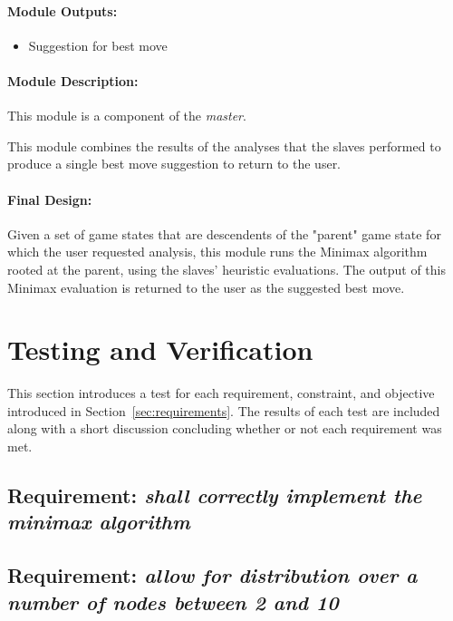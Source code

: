 \documentclass[pdftex,12pt,a4paper]{article}
\begin{document}
\paragraph{Module Outputs:}
\begin{itemize}
\item Suggestion for best move
\end{itemize}

\paragraph{Module Description:\\}
This module is a component of the \emph{master}.

This module combines the results of the analyses that the slaves performed to produce a single best move suggestion to return to the user.

\paragraph{Final Design:\\}
Given a set of game states that are descendents of the "parent" game state for which the user requested analysis, this module runs the Minimax algorithm rooted at the parent, using the slaves' heuristic evaluations. The output of this Minimax evaluation is returned to the user as the suggested best move.


%
%
\section{Testing and Verification}

This section introduces a test for each requirement, constraint, and objective introduced in Section~\ref{sec:requirements}. The results of each test are included along with a short discussion concluding whether or not each requirement was met.


\subsection{\textbf{Requirement:} \emph{shall correctly implement the minimax algorithm}}\label{sec:req-correctness}

\subsection{\textbf{Requirement:} \emph{allow for distribution over a number of nodes between 2 and 10}}
\end{document}
